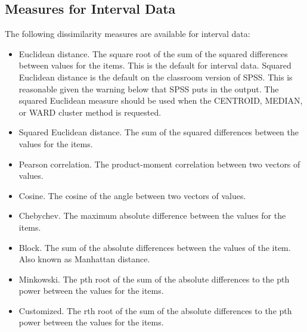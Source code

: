 \documentclass[a4paper,12pt]{article}
\begin{document}
\subsection*{Measures for Interval Data}
The following dissimilarity measures are available for interval data:
\begin{itemize}
	
	\item Euclidean distance. The square root of the sum of the squared differences between values for the items. This is the default for interval data. {Squared Euclidean distance is the default on the classroom version of SPSS.  This is reasonable given the warning below that SPSS puts in the output.} 
	The squared Euclidean measure should be used when the CENTROID, MEDIAN, or WARD cluster method is requested.
	\item 	Squared Euclidean distance. The sum of the squared differences between the values for the items. 
	\item 	Pearson correlation. The product-moment correlation between two vectors of values. 
	\item 	Cosine. The cosine of the angle between two vectors of values. 
	\item 	Chebychev. The maximum absolute difference between the values for the items. 
	\item 	Block. The sum of the absolute differences between the values of the item. Also known as Manhattan distance. 
	\item 	Minkowski. The pth root of the sum of the absolute differences to the pth power between the values for the items. 
	\item 	Customized. The rth root of the sum of the absolute differences to the pth power between the values for the items.
\end{itemize}
\end{document}
